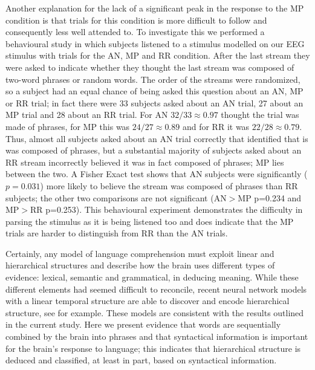 \documentclass[10pt,letterpaper]{article}
\newcommand{\citet}[1]{\cite{#1}}
\begin{document}
Another explanation for the lack of a significant peak in the response
to the MP condition is that trials for this condition is more
difficult to follow and consequently less well attended to. To
investigate this we performed a behavioural study in which subjects
listened to a stimulus modelled on our EEG stimulus with trials for
the AN, MP and RR condition. After the last stream they were asked to
indicate whether they thought the last stream was composed of two-word
phrases or random words. The order of the streams were randomized, so
a subject had an equal chance of being asked this question about an
AN, MP or RR trial; in fact there were 33 subjects asked about an AN
trial, 27 about an MP trial and 28 about an RR trial. For AN
$32/33\approx 0.97$ thought the trial was made of phrases, for MP this
was $24/27\approx 0.89$ and for RR it was $22/28\approx 0.79$. Thus,
almost all subjects asked about an AN trial correctly that identified
that is was composed of phrases, but a substantial majority of
subjects asked about an RR stream incorrectly believed it was in fact
composed of phrases; MP lies between the two. A Fisher Exact test
shows that AN subjects were significantly ($p=0.031$) more likely to
believe the stream was composed of phrases than RR subjects; the other
two comparisons are not significant (AN$>$MP p=0.234 and MP$>$RR
p=0.253). This behavioural experiment demonstrates the difficulty in
parsing the stimulus as it is being listened too and does indicate
that the MP trials are harder to distinguish from RR than the AN
trials.


Certainly, any model of language comprehension must exploit linear and
hierarchical structures and describe how the brain uses different
types of evidence: lexical, semantic and grammatical, in deducing
meaning. While these different elements had seemed difficult to
reconcile, recent neural network models with a linear temporal
structure are able to discover and encode hierarchical structure, see
\citet{LakretzEtAl2019,Baroni2019} for example. These models are
consistent with the results outlined in the current study. Here we
present evidence that words are sequentially combined by the brain
into phrases and that syntactical information is important for the
brain's response to language; this indicates that hierarchical
structure is deduced and classified, at least in part, based on
syntactical information.
\end{document}
